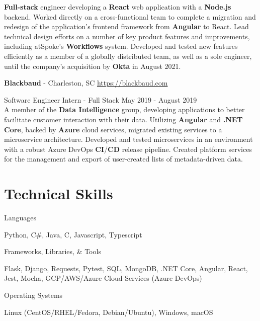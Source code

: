 \documentclass[margin,line]{resume}
\newcommand{\rurl}[1]{\hfill {\footnotesize \url{#1}}}
\begin{document}
\begin{resume}
\begin{asparablank}
    \small \textbf{Full-stack} engineer developing a \textbf{React} web application with a \textbf{Node.js} backend.
    \small Worked directly on a cross-functional team to complete a migration and redesign of the application's frontend framework from \textbf{Angular} to React.
    \small Lead technical design efforts on a number of key product features and improvements, including atSpoke's \textbf{Workflows} system.
    \small Developed and tested new features efficiently as a member of a globally distributed team, as well as a sole engineer, until the company's acquisition by \textbf{Okta} in August 2021.
    \normalsize
    \\
	\item{\bf Blackbaud} - Charleston, SC \rurl{https://blackbaud.com}
	\small \item Software Engineer Intern - Full Stack \hfill May 2019 - August 2019 \\

	\small A member of the \textbf{Data Intelligence} group, developing applications to better facilitate customer interaction with their data.
	\small Utilizing \textbf{Angular} and \textbf{.NET Core}, backed by \textbf{Azure} cloud services, migrated existing services to a microservice architecture.
	\small Developed and tested microservices in an environment with a robust Azure DevOps \textbf{CI}/\textbf{CD} release pipeline.
	\small Created platform services for the management and export of user-created lists of metadata-driven data.
	\normalsize
	\end{asparablank}

\section{\mysidestyle Technical Skills}
	\begin{compactdesc}
		\item[Languages] \begin{inparaenum} { \small
			Python, C\#, Java, C, Javascript, Typescript
		} \end{inparaenum}
        \item[Frameworks, Libraries, \& Tools] \begin{inparaenum} { \small
			Flask, Django, Requests, Pytest, SQL, MongoDB, .NET Core, Angular, React, Jest, Mocha, GCP/AWS/Azure Cloud Services (Azure DevOps)
        } \end{inparaenum}
		\item[Operating Systems] \begin{inparaenum} { \small
			Linux (CentOS/RHEL/Fedora, Debian/Ubuntu), Windows, macOS
		} \end{inparaenum}
        \normalsize
	\end{compactdesc}


\end{resume}
\end{document}

